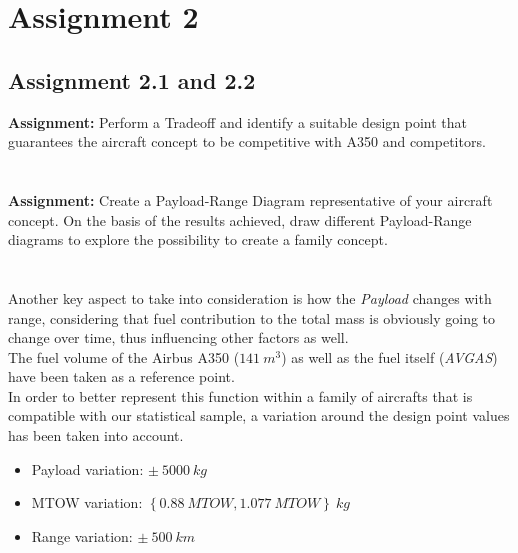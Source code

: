\documentclass{article}
\begin{document}
\section{Assignment 2\label{Assignment_2}}
\subsection{Assignment 2.1 and 2.2\label{Assignment_2.1}}
\textbf{Assignment:} Perform a Tradeoff and identify a suitable design point that 
guarantees the aircraft concept to be competitive with A350 and competitors. \\ \\ \\ 
\textbf{Assignment:} Create a Payload-Range Diagram representative of your aircraft concept. 
On the basis of the results achieved, draw different Payload-Range diagrams to explore 
the possibility to create a family concept.\\ \\ \\ 


Another key aspect to take into consideration is how the \textit{Payload} changes with 
 range, considering that fuel contribution to the total mass is obviously going
to change over time, thus influencing other factors as well. \\ 
The fuel volume of the Airbus A350 ($141 \ m^3$) as well as
the fuel itself (\textit{AVGAS}) have been taken as a reference point.\\ 
In order to better represent this function within a family of aircrafts that
is compatible with our statistical sample, a variation around the design point values has been 
taken into account.\\ 

\begin{itemize}
    \item Payload variation: $\pm \ 5000 \ kg$
    \item MTOW variation: $\left \{ {0.88 \ MTOW, 1.077 \ MTOW} \right \} \ kg$
    \item Range variation: $\pm \ 500 \ km$
\end{itemize}
\end{document}
